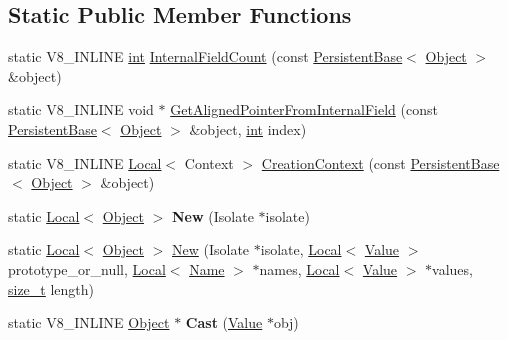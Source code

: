 \subsection*{Static Public Member Functions}
\begin{DoxyCompactItemize}
\item 
static V8\+\_\+\+I\+N\+L\+I\+NE \mbox{\hyperlink{classint}{int}} \mbox{\hyperlink{classv8_1_1Object_a324a71142f621a32bfe5738648718370}{Internal\+Field\+Count}} (const \mbox{\hyperlink{classv8_1_1PersistentBase}{Persistent\+Base}}$<$ \mbox{\hyperlink{classv8_1_1Object}{Object}} $>$ \&object)
\item 
static V8\+\_\+\+I\+N\+L\+I\+NE void $\ast$ \mbox{\hyperlink{classv8_1_1Object_a65b5a3dc93c0774594f8b0f2ab5481c8}{Get\+Aligned\+Pointer\+From\+Internal\+Field}} (const \mbox{\hyperlink{classv8_1_1PersistentBase}{Persistent\+Base}}$<$ \mbox{\hyperlink{classv8_1_1Object}{Object}} $>$ \&object, \mbox{\hyperlink{classint}{int}} index)
\item 
static V8\+\_\+\+I\+N\+L\+I\+NE \mbox{\hyperlink{classv8_1_1Local}{Local}}$<$ Context $>$ \mbox{\hyperlink{classv8_1_1Object_ae958203f358c7af3727ef7179790d01f}{Creation\+Context}} (const \mbox{\hyperlink{classv8_1_1PersistentBase}{Persistent\+Base}}$<$ \mbox{\hyperlink{classv8_1_1Object}{Object}} $>$ \&object)
\item 
\mbox{\label{classv8_1_1Object_a3451edb58d1984b18652d925ec0bf756}} 
static \mbox{\hyperlink{classv8_1_1Local}{Local}}$<$ \mbox{\hyperlink{classv8_1_1Object}{Object}} $>$ {\bfseries New} (Isolate $\ast$isolate)
\item 
static \mbox{\hyperlink{classv8_1_1Local}{Local}}$<$ \mbox{\hyperlink{classv8_1_1Object}{Object}} $>$ \mbox{\hyperlink{classv8_1_1Object_a05d2159c7d1b949c2706ab9c3b6c972b}{New}} (Isolate $\ast$isolate, \mbox{\hyperlink{classv8_1_1Local}{Local}}$<$ \mbox{\hyperlink{classv8_1_1Value}{Value}} $>$ prototype\+\_\+or\+\_\+null, \mbox{\hyperlink{classv8_1_1Local}{Local}}$<$ \mbox{\hyperlink{classv8_1_1Name}{Name}} $>$ $\ast$names, \mbox{\hyperlink{classv8_1_1Local}{Local}}$<$ \mbox{\hyperlink{classv8_1_1Value}{Value}} $>$ $\ast$values, \mbox{\hyperlink{classsize__t}{size\+\_\+t}} length)
\item 
\mbox{\label{classv8_1_1Object_a1f9ac46d0b164197318ce81dc0ec1343}} 
static V8\+\_\+\+I\+N\+L\+I\+NE \mbox{\hyperlink{classv8_1_1Object}{Object}} $\ast$ {\bfseries Cast} (\mbox{\hyperlink{classv8_1_1Value}{Value}} $\ast$obj)
\end{DoxyCompactItemize}


